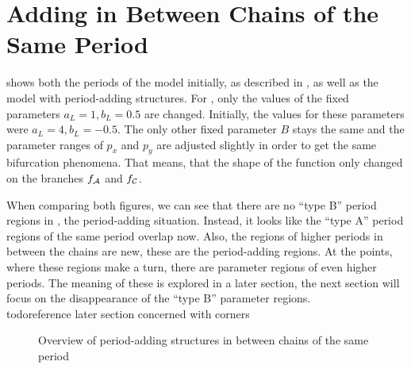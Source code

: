 \section{Adding in Between Chains of the Same Period}

 shows both the periods of the model initially, as described in , as well as the model with period-adding structures.
For , only the values of the fixed parameters $a_L = 1, b_L = 0.5$ are changed.
Initially, the values for these parameters were $a_L = 4, b_L = -0.5$.
The only other fixed parameter $B$ stays the same and the parameter ranges of $p_x$ and $p_y$ are adjusted slightly in order to get the same bifurcation phenomena.
That means, that the shape of the function only changed on the branches $f_{\mathcal{A}}$ and $f_{\mathcal{C}}$.

When comparing both figures, we can see that there are no ``type B'' period regions in , the period-adding situation.
Instead, it looks like the ``type A'' period regions of the same period overlap now.
Also, the regions of higher periods in between the chains are new, these are the period-adding regions.
At the points, where these regions make a turn, there are parameter regions of even higher periods.
The meaning of these is explored in a later section, the next section will focus on the disappearance of the ``type B'' parameter regions.
\\todo{reference later section concerned with corners}

\begin{figure}
    \centering
    \caption{Overview of period-adding structures in between chains of the same period}
    \label{fig:minrep.adding1.overview}
\end{figure}



